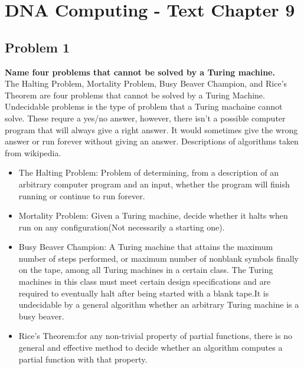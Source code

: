 
\chapter{DNA Computing - Text Chapter 9}


\section{ Problem 1 }
\textbf{ Name four problems that cannot be solved by a Turing machine. } \\
The Halting Problem, Mortality Problem, Busy Beaver Champion, and Rice's Theorem are four problems that cannot be solved by a Turing Machine. Undecidable problems is the type of problem that a Turing machaine cannot solve. These requre a yes/no answer, however, there isn't a possible computer program that will always give a right answer. It would sometimes give the wrong answer or run forever without giving an answer. Descriptions of algorithms taken from wikipedia.
\begin{itemize}
\item The Halting Problem: Problem of determining, from a description of an arbitrary computer program and an input, whether the program will finish running or continue to run forever.
\item Mortality Problem: Given a Turing machine, decide whether it halts when run on any configuration(Not necessarily a starting one).
\item Busy Beaver Champion: A Turing machine that attains the maximum number of steps performed, or maximum number of nonblank symbols finally on the tape, among all Turing machines in a certain class. The Turing machines in this class must meet certain design specifications and are required to eventually halt after being started with a blank tape.It is undecidable by a general algorithm whether an arbitrary Turing machine is a busy beaver.
\item Rice's Theorem:for any non-trivial property of partial functions, there is no general and effective method to decide whether an algorithm computes a partial function with that property.
\end{itemize}

